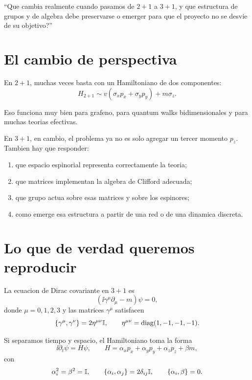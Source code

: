 \begin{displayquote}
\enquote{Que cambia realmente cuando pasamos de \(2+1\) a \(3+1\), y que estructura de grupos y de algebra debe preservarse o emerger para que el proyecto no se desvie de su objetivo?}
\end{displayquote}

\section{El cambio de perspectiva}

En \(2+1\), muchas veces basta con un Hamiltoniano de dos componentes:
\begin{equation}
H_{2+1}\sim v(\sigma_x p_x + \sigma_y p_y) + m\sigma_z.
\end{equation}

Eso funciona muy bien para grafeno, para quantum walks bidimensionales y para muchas teorias efectivas.

En \(3+1\), en cambio, el problema ya no es solo agregar un tercer momento \(p_z\). Tambien hay que responder:

\begin{enumerate}[leftmargin=*]
  \item que espacio espinorial representa correctamente la teoria;
  \item que matrices implementan la algebra de Clifford adecuada;
  \item que grupo actua sobre esas matrices y sobre los espinores;
  \item como emerge esa estructura a partir de una red o de una dinamica discreta.
\end{enumerate}

\section{Lo que de verdad queremos reproducir}

La ecuacion de Dirac covariante en \(3+1\) es
\begin{equation}
\left(\ii \gamma^\mu \partial_\mu - m\right)\psi = 0,
\label{c17:eq:dirac-cov}
\end{equation}
donde \(\mu=0,1,2,3\) y las matrices \(\gamma^\mu\) satisfacen
\begin{equation}
\{\gamma^\mu,\gamma^\nu\}=2\eta^{\mu\nu}\mathbb{I},
\qquad
\eta^{\mu\nu}=\mathrm{diag}(1,-1,-1,-1).
\label{c17:eq:clifford}
\end{equation}

Si separamos tiempo y espacio, el Hamiltoniano toma la forma
\begin{equation}
\ii\partial_t\psi = H\psi,
\qquad
H = \alpha_x p_x + \alpha_y p_y + \alpha_z p_z + \beta m,
\label{c17:eq:ham-dirac}
\end{equation}
con
\begin{equation}
\alpha_i^2=\beta^2=\mathbb{I},
\qquad
\{\alpha_i,\alpha_j\}=2\delta_{ij}\mathbb{I},
\qquad
\{\alpha_i,\beta\}=0.
\label{c17:eq:alpha-beta}
\end{equation}

